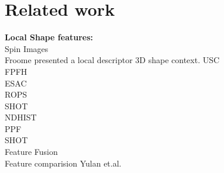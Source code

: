 \documentclass[10pt,twocolumn,letterpaper]{article}
\begin{document}
\section{Related work}
\textbf{Local Shape features:}\\


Spin Images \cite{Johnson1999}\\
Froome \etal \cite{Frome2004} presented a local descriptor 3D shape context.
USC \cite{usc2010}\\


FPFH \cite{Fpfh2009}\\
ESAC \cite{Ecsad2015}\\
ROPS \cite{Guo2013}\\
SHOT \cite{Salti2014}\\
NDHIST\\
PPF \cite{Drost2010}\\
SHOT \cite{Tombari2010}\\

Feature Fusion \cite{Buch2016}\\
Feature comparision Yulan et.al. \cite{Guo2015}







{\small


}
\end{document}
